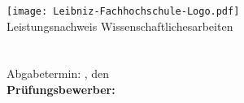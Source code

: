 \begin{titlepage}

\begin{center}
\texttt{[image: Leibniz-Fachhochschule-Logo.pdf]}\\[-5ex]
\LARGE{Leistungsnachweis Wissenschaftlichesarbeiten}\\[1ex]


\huge{\textbf{\titel}}\\[1.5ex]
\Large{\textbf{\untertitel}}\\[4ex]

\normalsize
Abgabetermin: \abgabeOrt, den \abgabeTermin\\[3em]
\textbf{Prüfungsbewerber:}\\
\autorName\\
\autorAnschrift\\
\autorOrt\\[5ex]

\end{center}


\end{titlepage}